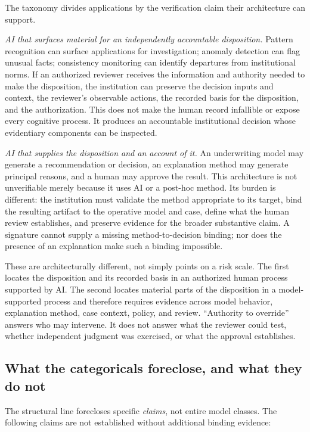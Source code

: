 The taxonomy divides applications by the verification claim their architecture can support.

\emph{AI that surfaces material for an independently accountable disposition.} Pattern recognition can surface applications for investigation; anomaly detection can flag unusual facts; consistency monitoring can identify departures from institutional norms. If an authorized reviewer receives the information and authority needed to make the disposition, the institution can preserve the decision inputs and context, the reviewer's observable actions, the recorded basis for the disposition, and the authorization. This does not make the human record infallible or expose every cognitive process. It produces an accountable institutional decision whose evidentiary components can be inspected.

\emph{AI that supplies the disposition and an account of it.} An underwriting model may generate a recommendation or decision, an explanation method may generate principal reasons, and a human may approve the result. This architecture is not unverifiable merely because it uses AI or a post-hoc method. Its burden is different: the institution must validate the method appropriate to its target, bind the resulting artifact to the operative model and case, define what the human review establishes, and preserve evidence for the broader substantive claim. A signature cannot supply a missing method-to-decision binding; nor does the presence of an explanation make such a binding impossible.

These are architecturally different, not simply points on a risk scale. The first locates the disposition and its recorded basis in an authorized human process supported by AI. The second locates material parts of the disposition in a model-supported process and therefore requires evidence across model behavior, explanation method, case context, policy, and review. ``Authority to override'' answers who may intervene. It does not answer what the reviewer could test, whether independent judgment was exercised, or what the approval establishes.

\subsection{What the categoricals foreclose, and what they do not}
\label{sec:verification-regimes:foreclosures}

The structural line forecloses specific \emph{claims}, not entire model classes. The following claims are not established without additional binding evidence:

